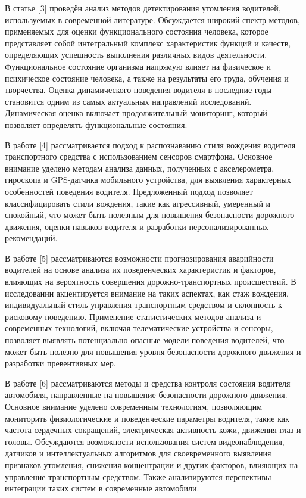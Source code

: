 В статье {[}3{]} проведён анализ методов детектирования утомления
водителей, используемых в современной литературе. Обсуждается широкий
спектр методов, применяемых для оценки функционального состояния
человека, которое представляет собой интегральный комплекс характеристик
функций и качеств, определяющих успешность выполнения различных видов
деятельности. Функциональное состояние организма напрямую влияет на
физическое и психическое состояние человека, а также на результаты его
труда, обучения и творчества. Оценка динамического поведения водителя в
последние годы становится одним из самых актуальных направлений
исследований. Динамическая оценка включает продолжительный мониторинг,
который позволяет определять функциональные состояния.

В работе {[}4{]} рассматривается подход к распознаванию стиля вождения
водителя транспортного средства с использованием сенсоров смартфона.
Основное внимание уделено методам анализа данных, полученных с
акселерометра, гироскопа и GPS-датчика мобильного устройства, для
выявления характерных особенностей поведения водителя. Предложенный
подход позволяет классифицировать стили вождения, такие как агрессивный,
умеренный и спокойный, что может быть полезным для повышения
безопасности дорожного движения, оценки навыков водителя и разработки
персонализированных рекомендаций.

В работе {[}5{]} рассматриваются возможности прогнозирования аварийности
водителей на основе анализа их поведенческих характеристик и факторов,
влияющих на вероятность совершения дорожно-транспортных происшествий. В
исследовании акцентируется внимание на таких аспектах, как стаж
вождения, индивидуальный стиль управления транспортным средством и
склонность к рисковому поведению. Применение статистических методов
анализа и современных технологий, включая телематические устройства и
сенсоры, позволяет выявлять потенциально опасные модели поведения
водителей, что может быть полезно для повышения уровня безопасности
дорожного движения и разработки превентивных мер.

В работе {[}6{]} рассматриваются методы и средства контроля состояния
водителя автомобиля, направленные на повышение безопасности дорожного
движения. Основное внимание уделено современным технологиям, позволяющим
мониторить физиологические и поведенческие параметры водителя, такие как
частота сердечных сокращений, электрическая активность кожи, движения
глаз и головы. Обсуждаются возможности использования систем
видеонаблюдения, датчиков и интеллектуальных алгоритмов для
своевременного выявления признаков утомления, снижения концентрации и
других факторов, влияющих на управление транспортным средством. Также
анализируются перспективы интеграции таких систем в современные
автомобили.

